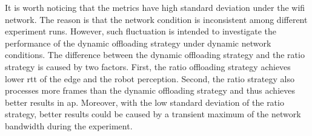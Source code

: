It is worth noticing that the metrics have high standard deviation under the \gls{wifi} network. The reason is that the network condition is inconsistent among different experiment runs. However, such fluctuation is intended to investigate the performance of the dynamic offloading strategy under dynamic network conditions. The difference between the dynamic offloading strategy and the ratio strategy is caused by two factors. First, the ratio offloading strategy achieves lower \gls{rtt} of the edge and the robot perception. Second, the ratio strategy also processes more frames than the dynamic offloading strategy and thus achieves better results in \gls{ap}. Moreover, with the low standard deviation of the ratio strategy, better results could be caused by a transient maximum of the network bandwidth during the experiment. 

